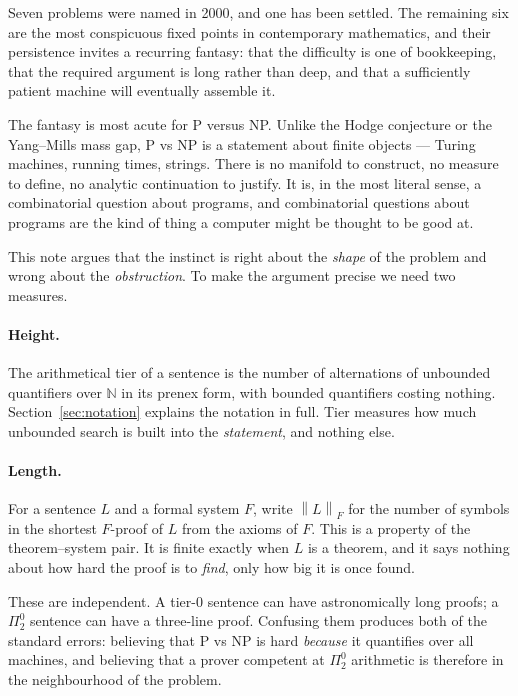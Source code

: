 \documentclass[11pt,a4paper]{article}
\newcommand{\Pai}[2]{\Pi^{#1}_{#2}}
\newcommand{\shortest}[1]{\left\lVert #1 \right\rVert}
\begin{document}
Seven problems were named in 2000, and one has been settled. The remaining six
are the most conspicuous fixed points in contemporary mathematics, and their
persistence invites a recurring fantasy: that the difficulty is one of
bookkeeping, that the required argument is long rather than deep, and that a
sufficiently patient machine will eventually assemble it.

The fantasy is most acute for P versus NP. Unlike the Hodge conjecture or the
Yang--Mills mass gap, P vs NP is a statement about finite objects --- Turing
machines, running times, strings. There is no manifold to construct, no
measure to define, no analytic continuation to justify. It is, in the most
literal sense, a combinatorial question about programs, and combinatorial
questions about programs are the kind of thing a computer might be thought to
be good at.

This note argues that the instinct is right about the \emph{shape} of the
problem and wrong about the \emph{obstruction}. To make the argument precise
we need two measures.

\paragraph{Height.} The arithmetical tier of a sentence is the number of
alternations of unbounded quantifiers over $\mathbb{N}$ in its prenex form,
with bounded quantifiers costing nothing. Section~\ref{sec:notation} explains
the notation in full. Tier measures how much unbounded search is built into
the \emph{statement}, and nothing else.

\paragraph{Length.} For a sentence $L$ and a formal system $F$, write
$\shortest{L}_F$ for the number of symbols in the shortest $F$-proof of $L$
from the axioms of $F$. This is a property of the theorem--system pair. It is
finite exactly when $L$ is a theorem, and it says nothing about how hard the
proof is to \emph{find}, only how big it is once found.

These are independent. A tier-$0$ sentence can have astronomically long
proofs; a $\Pai{0}{2}$ sentence can have a three-line proof. Confusing them
produces both of the standard errors: believing that P vs NP is hard
\emph{because} it quantifies over all machines, and believing that a prover
competent at $\Pai{0}{2}$ arithmetic is therefore in the neighbourhood of the
problem.
\end{document}

